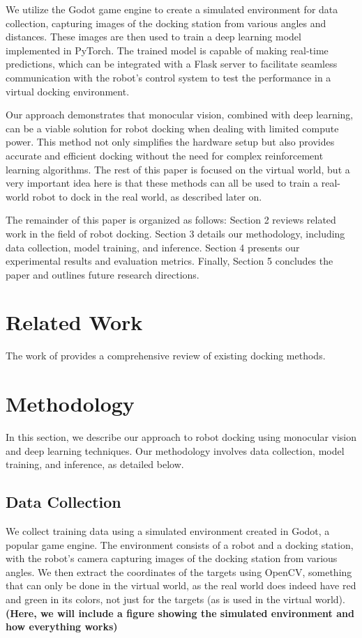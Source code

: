 \documentclass{article}
\begin{document}
We utilize the Godot game engine to create a simulated environment for data collection, capturing images of the docking station from various angles and distances. These images are then used to train a deep learning model implemented in PyTorch. The trained model is capable of making real-time predictions, which can be integrated with a Flask server to facilitate seamless communication with the robot's control system to test the performance in a virtual docking environment.

Our approach demonstrates that monocular vision, combined with deep learning, can be a viable solution for robot docking when dealing with limited compute power. This method not only simplifies the hardware setup but also provides accurate and efficient docking without the need for complex reinforcement learning algorithms. The rest of this paper is focused on the virtual world, but a very important idea here is that these methods can all be used to train a real-world robot to dock in the real world, as described later on.

The remainder of this paper is organized as follows: Section 2 reviews related work in the field of robot docking. Section 3 details our methodology, including data collection, model training, and inference. Section 4 presents our experimental results and evaluation metrics. Finally, Section 5 concludes the paper and outlines future research directions.

\section{Related Work}
The work of \citet{app131910675} provides a comprehensive review of existing docking methods.

\section{Methodology}
In this section, we describe our approach to robot docking using monocular vision and deep learning techniques. Our methodology involves data collection, model training, and inference, as detailed below.

\subsection{Data Collection}
We collect training data using a simulated environment created in Godot, a popular game engine. The environment consists of a robot and a docking station, with the robot's camera capturing images of the docking station from various angles. We then extract the coordinates of the targets using OpenCV, something that can only be done in the virtual world, as the real world does indeed have red and green in its colors, not just for the targets (as is used in the virtual world).
\textbf{(Here, we will include a figure showing the simulated environment and how everything works)}
\end{document}
